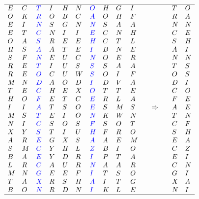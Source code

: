 \documentclass{article}
\begin{document}
$$
\begin{array}{lllllllllllllll}
\hline
E& C& \color{blue}{T}& I& H& N& \color{blue}{O}& H& G& I& &&& T& O\\
O& K& \color{blue}{R}& O& B& C& \color{blue}{A}& O& H& F& &&& R& A\\
E& I& \color{blue}{N}& S& G& N& \color{blue}{N}& S& A& A& &&& N& N\\
E& T& \color{blue}{C}& N& I& I& \color{blue}{E}& C& N& H& &&& C& E\\
O& A& \color{blue}{S}& R& E& E& \color{blue}{H}& C& T& L& &&& S& H\\
H& S& \color{blue}{A}& A& T& E& \color{blue}{I}& B& N& E& &&& A& I\\
S& F& \color{blue}{N}& E& U& C& \color{blue}{N}& O& E& R& &&& N& N\\
R& E& \color{blue}{T}& I& U& S& \color{blue}{S}& S& A& A& &&& T& S\\
R& E& \color{blue}{O}& C& U& W& \color{blue}{S}& O& I& F& &&& O& S\\
M& N& \color{blue}{D}& A& O& D& \color{blue}{I}& D& V& A& &&& D& I\\
T& E& \color{blue}{C}& H& E& X& \color{blue}{O}& T& T& E& &&& C& O\\
H& O& \color{blue}{F}& E& T& C& \color{blue}{E}& R& L& A& &&& F& E\\
I& I& \color{blue}{A}& T& S& O& \color{blue}{E}& S& M& S& &\Rightarrow	&& A& E\\
M& S& \color{blue}{T}& E& I& O& \color{blue}{N}& K& W& N& &&& T& N\\
N& I& \color{blue}{C}& S& O& S& \color{blue}{F}& S& O& T& &&& C& F\\
X& Y& \color{blue}{S}& T& I& U& \color{blue}{H}& F& R& O& &&& S& H\\
A& R& \color{blue}{E}& G& X& S& \color{blue}{A}& A& E& M& &&& E& A\\
S& M& \color{blue}{C}& Y& H& L& \color{blue}{Z}& B& I& O& &&& C& Z\\
B& A& \color{blue}{E}& Y& D& R& \color{blue}{I}& P& T& A& &&& E& I\\
L& R& \color{blue}{C}& A& U& R& \color{blue}{N}& A& A& R& &&& C& N\\
M& N& \color{blue}{G}& E& E& F& \color{blue}{I}& T& S& O& &&& G& I\\
T& A& \color{blue}{X}& R& S& H& \color{blue}{A}& I& T &G& &&& X& A\\
B& O& \color{blue}{N}& R& D& N& \color{blue}{I}& K& L& E& &&& N& I\\
\hline
\end{array}
$$
\end{document}
